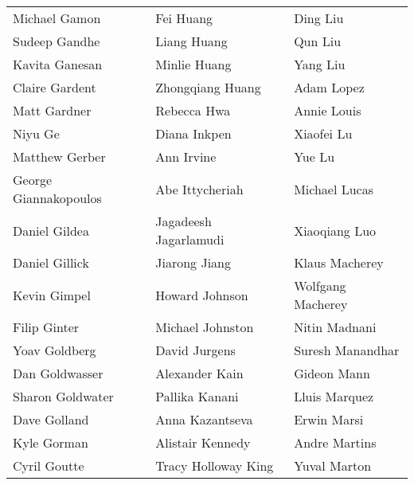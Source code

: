\begin{tabular*}{\textwidth}{@{\extracolsep{\fill}} lll }
  Michael Gamon  & Fei Huang  & Ding Liu \\
  Sudeep Gandhe  & Liang Huang  & Qun Liu \\
  Kavita Ganesan  & Minlie Huang  & Yang Liu \\
  Claire Gardent  & Zhongqiang Huang  & Adam Lopez \\
  Matt Gardner  & Rebecca Hwa  & Annie Louis \\
  Niyu Ge  & Diana Inkpen  & Xiaofei Lu \\
  Matthew Gerber  & Ann Irvine  & Yue Lu \\
  George Giannakopoulos  & Abe Ittycheriah  & Michael Lucas \\
  Daniel Gildea  & Jagadeesh Jagarlamudi  & Xiaoqiang Luo \\
  Daniel Gillick  & Jiarong Jiang  & Klaus Macherey \\
  Kevin Gimpel  & Howard Johnson  & Wolfgang Macherey \\
  Filip Ginter  & Michael Johnston  & Nitin Madnani \\
  Yoav Goldberg  & David Jurgens  & Suresh Manandhar \\
  Dan Goldwasser  & Alexander Kain  & Gideon Mann \\
  Sharon Goldwater  & Pallika Kanani  & Lluis Marquez \\
  Dave Golland  & Anna Kazantseva  & Erwin Marsi \\
  Kyle Gorman  & Alistair Kennedy  & Andre Martins \\
  Cyril Goutte  & Tracy Holloway King  & Yuval Marton \\
\end{tabular*}

